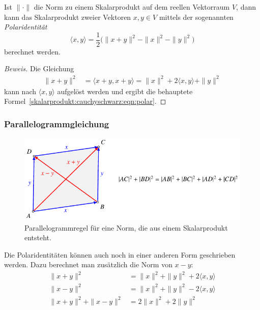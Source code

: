 \begin{satz}[Polaridentität]
\label{skalarprodukt:cauchyschwarz:satz:polarformel}
Ist $\|\cdot\|$ die Norm zu einem Skalarprodukt auf dem reellen Vektorraum
$V$, dann kann das Skalarprodukt zweier Vektoren $x,y\in V$ mittels
der sogenannten {\em Polaridentität}
%
\begin{equation}
\langle x, y\rangle
=
\frac12\bigl(
\|x+y\|^2 - \|x\|^2 - \|y\|^2 
\bigr)
\label{skalarprodukt:cauchyschwarz:eqn:polar}
\end{equation}
berechnet werden.
\end{satz}

\begin{proof}[Beweis]
Die Gleichung
\begin{align*}
\|x+y\|^2
&=
\langle x+y,x+y\rangle
=
\|x\|^2 + 2\langle x,y\rangle + \|y\|^2 
\end{align*}
kann nach $\langle x,y\rangle$ aufgelöst werden und ergibt
die behauptete Formel~\eqref{skalarprodukt:cauchyschwarz:eqn:polar}.
\end{proof}

% 
%
\subsubsection{Parallelogrammgleichung}
\begin{figure}
\centering
\includegraphics{chapters/010-skalarprodukt/images/parallelogramm.pdf}
\caption{Parallelogrammregel für eine Norm, die aus einem Skalarprodukt
entsteht.
\label{skalarprodukt:cauchyschwarz:fig:parallelogramm}}
\end{figure}
Die Polaridentitäten können auch noch in einer anderen Form geschrieben
werden.
Dazu berechnet man zusätzlich die Norm von $x-y$:
\begin{align*}
\|x+y\|^2
&=
\|x\|^2 + \|y\|^2 + 2\langle x, y\rangle
\\
\|x-y\|^2
&=
\|x\|^2 + \|y\|^2 - 2\langle x, y\rangle
\\
\|x+y\|^2 +\|x-y\|^2
&=
2\|x\|^2 + 2\|y\|^2
\end{align*}

